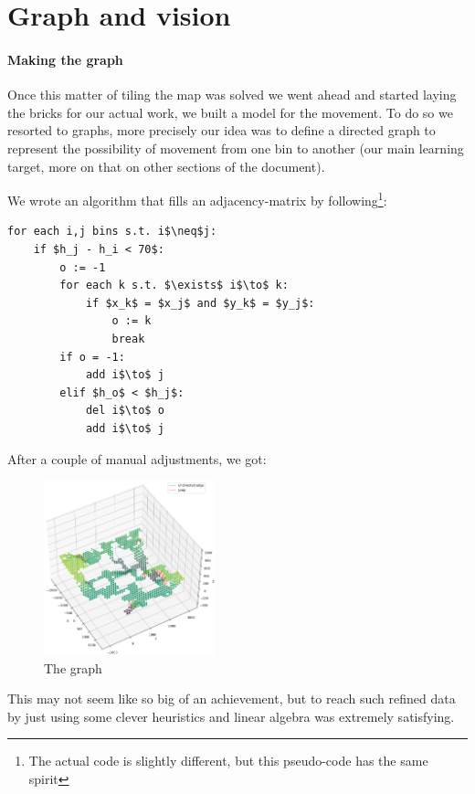 \documentclass[9pt, a4paper]{IEEEtran}
\begin{document}
    \section{Graph and vision}

    \paragraph*{Making the graph}
    Once this matter of tiling the map was solved we went ahead and started laying the bricks for our actual work, we built a model for the movement. To do so we resorted to graphs, more precisely our idea was to define a directed graph to represent the possibility of movement from one bin to another (our main learning target, more on that on other sections of the document).

    We wrote an algorithm that fills an adjacency-matrix by following\footnote{The actual code is slightly different, but this pseudo-code has the same spirit}:
    \begin{lstlisting}
for each i,j bins s.t. i$\neq$j:
    if $h_j - h_i < 70$:
        o := -1
        for each k s.t. $\exists$ i$\to$ k:
            if $x_k$ = $x_j$ and $y_k$ = $y_j$:
                o := k
                break
        if o = -1:
            add i$\to$ j
        elif $h_o$ < $h_j$:
            del i$\to$ o
            add i$\to$ j
    \end{lstlisting}

    \newpage
    After a couple of manual adjustments, we got:

    \begin{figure}[h]
        \caption{The graph}
        \centering
        \includegraphics[width=0.44\textwidth]{images/graph.png}
    \end{figure}

    This may not seem like so big of an achievement, but to reach such refined data by just using some clever heuristics and linear algebra was extremely satisfying.
\end{document}
